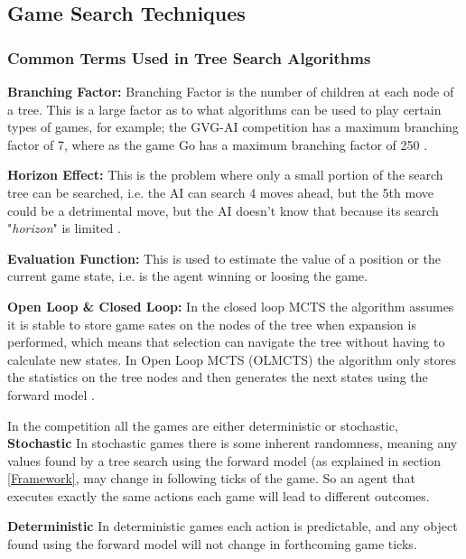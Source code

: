 \documentclass[journal]{IEEEtran}
\begin{document}
	\subsection{Game Search Techniques} \label{ssec:GST}
		\subsubsection{Common Terms Used in Tree Search Algorithms} \label{sssec:Common}

		\textbf{Branching Factor:}
			Branching Factor is the number of children at each node of a tree. This is a large factor as to what algorithms can be used to play certain types of games, for example; the GVG-AI competition has a maximum branching factor of 7, where as the game Go has a maximum branching factor of 250 \cite{silver2016mastering, perez20162014}.

		\textbf{Horizon Effect:}
			This is the problem where only a small portion of the search tree can be searched, i.e. the AI can search 4 moves ahead, but the 5th move could be a detrimental move, but the AI doesn't know that because its search "\textit{horizon}" is limited \cite{joppen2017informed}.

		\textbf{Evaluation Function:}
			This is used to estimate the value of a position or the current game state, i.e. is the agent winning or loosing the game.
			
		\textbf{Open Loop \& Closed Loop:}
			In the closed loop MCTS the algorithm assumes it is stable to store game sates on the nodes of the tree when expansion is performed, which means that selection can navigate the tree without having to calculate new states.
			In Open Loop MCTS (OLMCTS) the algorithm only stores the statistics on the tree nodes and then generates the next states using the forward model \cite{perez2016analyzing, perez2015open}.
			
		
In the competition all the games are either deterministic or stochastic, 
	\textbf{Stochastic}
		In stochastic games there is some inherent randomness, meaning any values found by a  tree search using the forward model (as explained in section \ref{Framework}, may change in following ticks of the game. So an agent that executes exactly the same actions each game will lead to different outcomes.

	\textbf{Deterministic}
		In deterministic games each action is predictable, and any object found using the forward model will not change in forthcoming game ticks. 
		
\end{document}
